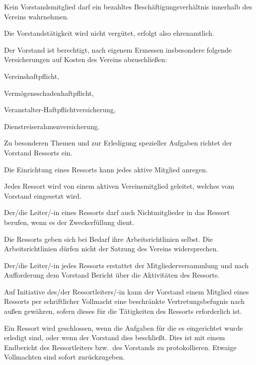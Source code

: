 \documentclass[draft]{scrartcl}
\begin{document}
\begin{contract}
Kein Vorstandsmitglied darf ein bezahltes Beschäftigungsverhältnis innerhalb
des Vereins wahrnehmen.

Die Vorstandstätigkeit wird nicht vergütet, erfolgt also ehrenamtlich.


Der Vorstand ist berechtigt, nach eigenem Ermessen insbesondere folgende
Versicherungen auf Kosten des Vereins abzuschließen:
\begin{compactenum}[\hspace{2em}1.]
  \item Vereinshaftpflicht,
  \item Vermögensschadenhaftpflicht,
  \item Veranstalter-Haftpflichtversicherung,
  \item Dienstreiserahmenversicherung.
\end{compactenum}


Zu besonderen Themen und zur Erledigung spezieller Aufgaben richtet der
Vorstand Ressorts ein.

Die Einrichtung eines Ressorts kann jedes aktive Mitglied anregen.

Jedes Ressort wird von einem aktiven Vereinsmitglied geleitet, welches vom
Vorstand eingesetzt wird.

Der/die Leiter/-in eines Ressorts darf auch Nichtmitglieder in das Ressort
berufen, wenn es der Zweckerfüllung dient.

Die Ressorts geben sich bei Bedarf ihre Arbeitsrichtlinien selbst. Die
Arbeitsrichtlinien dürfen nicht der Satzung des Vereins widersprechen.

Der/die Leiter/-in jedes Ressorts erstattet der Mitgliederversammlung und nach
Auf\/\-for\-derung dem Vorstand Bericht über die Aktivitäten des Ressorts.

Auf Initiative des/der Ressortleiters/-in kann der Vorstand einem Mitglied
eines Ressorts per schriftlicher Vollmacht eine beschränkte
Vertretungsbefugnis nach außen gewähren, sofern dieses für die Tätigkeiten des
Ressorts erforderlich ist.

Ein Ressort wird geschlossen, wenn die Aufgaben für die es eingerichtet wurde
erledigt sind, oder wenn der Vorstand dies beschließt. Dies ist mit einem
Endbericht des Ressortleiters bzw.\ des Vorstands zu protokollieren. Etwaige
Vollmachten sind sofort zurückzugeben.



\end{contract}
\end{document}
